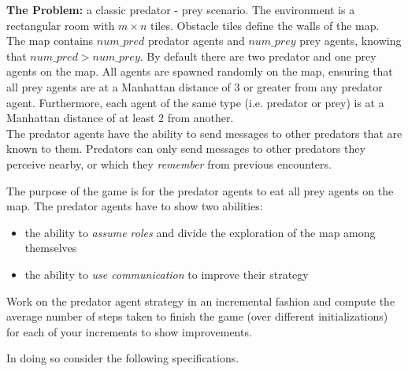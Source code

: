 \documentclass[a4paper, 12pt, twoside]{article}
\begin{document}
\spk{-2ex}

\vspace*{-6ex}\spk{1.2ex}

\textbf{The Problem:} a classic predator - prey scenario. The environment is a rectangular room with $m\times n$ tiles.
Obstacle tiles define the walls of the map.\\
%
The map contains $num\_pred$ predator agents and $num\_prey$ prey agents, knowing that $num\_pred > num\_prey$. By default there are two predator and one prey agents on the map. All agents are spawned randomly on the map, ensuring that all prey agents are at a Manhattan distance of 3 or greater from any predator agent. Furthermore, each agent of the same type (i.e. predator or prey) is at a Manhattan distance of at least 2 from another.\\
%

The predator agents have the ability to send messages to other predators that are known to them. Predators can only send messages to other predators they perceive nearby, or which they \textit{remember} from previous encounters.

The purpose of the game is for the predator agents to eat all prey agents on the map. 
The predator agents have to show two abilities:
\begin{itemize}
	\item the ability to \textit{assume roles} and divide the exploration of the map among themselves
	\item the ability to \textit{use communication} to improve their strategy
\end{itemize}

Work on the predator agent strategy in an incremental fashion and compute the average number of steps taken to finish the game (over different initializations) for each of your increments to show improvements.

In doing so consider the following specifications.

\end{document}
